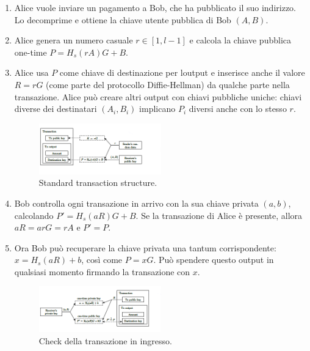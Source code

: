 \begin{enumerate}
\def\labelenumi{\arabic{enumi}.}
\item
  Alice vuole inviare un pagamento a Bob, che ha pubblicato il suo
  indirizzo. Lo decomprime e ottiene la chiave utente pubblica di Bob
  \emph{$(A, B)$}.
\item
  Alice genera un numero casuale $r \in [1,l-1]$ e calcola la chiave
  pubblica one-time $P=H_s(rA)G+B$.
\item
  Alice usa $P$ come chiave di destinazione per l\textquotesingle output e
  inserisce anche il valore $R=rG$ (come parte del protocollo
  Diffie-Hellman) da qualche parte nella transazione. Alice può creare
  altri output con chiavi pubbliche uniche: chiavi diverse dei
  destinatari \emph{$(A_i,B_i)$} implicano $P_i$ diversi anche con
  lo stesso $r$.

  \begin{figure}[h]
    \centering
    \includegraphics[width=0.5\textwidth]{image3.png}
    \caption{Standard transaction structure.}
    \label{fig:my_label}
  \end{figure}
\item
  Bob controlla ogni transazione in arrivo con la sua chiave privata $(a,
  b)$, calcolando $P'=H_s(aR)G+B$. Se la transazione di Alice è presente,
  allora $aR=arG=rA$ e $P'=P$.
\item
  Ora Bob può recuperare la chiave privata una tantum corrispondente:
  $x=H_s(aR)+b$, così come $P=xG$. Può spendere questo output in qualsiasi
  momento firmando la transazione con $x$.

  \begin{figure}[h]
    \centering
    \includegraphics[width=0.5\textwidth]{image4.png}
    \caption{Check della transazione in ingresso.}
    \label{fig:my_label}
  \end{figure}
\end{enumerate}


